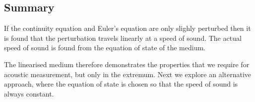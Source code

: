 








\subsection{Summary}
If the continuity equation and Euler's equation are only slighly perturbed
then it is found that the perturbation travels linearly at a speed of sound.
The actual speed of sound is found from the equation of state of the medium.

The linearised medium therefore demonstrates the properties that we require for acoustic measurement,
but only in the extremum.
Next we explore an alternative approach,
where the equation of state is chosen so that the speed of sound is always constant.

